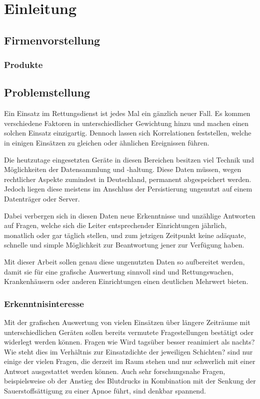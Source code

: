 \chapter{Einleitung}
\label{einleitung}
\minitoc\pagebreak


\section{Firmenvorstellung}
\subsection{Produkte}

\section{Problemstellung}
\label{problem}
Ein Einsatz im Rettungsdienst ist jedes Mal ein gänzlich neuer Fall. 
Es kommen verschiedene Faktoren in unterschiedlicher Gewichtung hinzu und machen einen solchen Einsatz einzigartig. 
Dennoch lassen sich Korrelationen feststellen, welche in einigen Einsätzen zu gleichen oder ähnlichen Ereignissen führen.

Die heutzutage eingesetzten Geräte in diesen Bereichen besitzen viel Technik und Möglichkeiten der Datensammlung und -haltung.
Diese Daten müssen, wegen rechtlicher Aspekte zumindest in Deutschland, permanent abgespeichert werden.
Jedoch liegen diese meistens im Anschluss der Persistierung ungenutzt auf einem Datenträger oder Server.

Dabei verbergen sich in diesen Daten neue Erkenntnisse und unzählige Antworten auf Fragen, welche sich die Leiter entsprechender Einrichtungen jährlich, monatlich oder gar täglich stellen, und zum jetzigen Zeitpunkt keine adäquate, schnelle und simple Möglichkeit zur Beantwortung jener zur Verfügung haben.

Mit dieser Arbeit sollen genau diese ungenutzten Daten so aufbereitet werden, damit sie für eine grafische Auswertung sinnvoll sind und Rettungswachen, Krankenhäusern oder anderen Einrichtungen einen deutlichen Mehrwert bieten.

\subsection{Erkenntnisinteresse}
\label{erkenntnis}
Mit der grafischen Auswertung von vielen Einsätzen über längere Zeiträume mit unterschiedlichen Geräten sollen bereits vermutete Fragestellungen bestätigt oder widerlegt werden können.
Fragen wie \glqq Wird tagsüber besser reanimiert als nachts? Wie steht dies im Verhältnis zur Einsatzdichte der jeweiligen Schichten?\grqq{} sind nur einige der vielen Fragen, die derzeit im Raum stehen und nur schwerlich mit einer Antwort ausgestattet werden können.
Auch sehr forschungsnahe Fragen, beispielsweise ob der Anstieg des Blutdrucks in Kombination mit der Senkung der Sauerstoffsättigung zu einer Apnoe führt, sind denkbar spannend.

